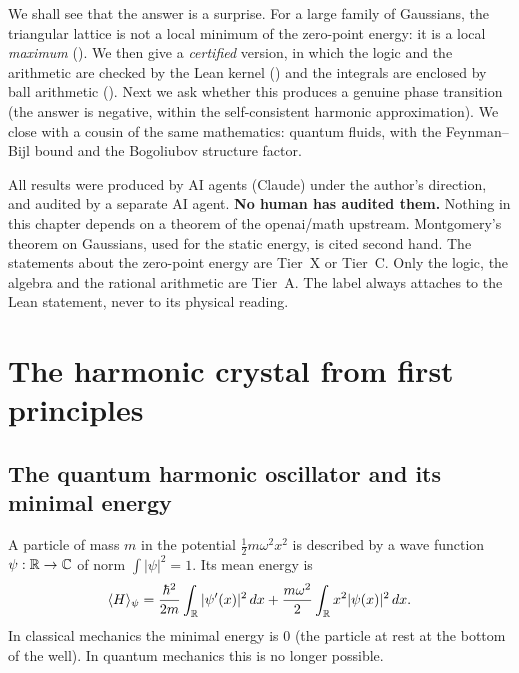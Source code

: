 We shall see that the answer is a surprise. For a large family of Gaussians, the triangular lattice is not a local
minimum of the zero-point energy: it is a local \emph{maximum} (\tierX). We then give a \emph{certified} version, in
which the logic and the arithmetic are checked by the Lean kernel (\tierA) and the integrals are enclosed by ball
arithmetic (\tierC). Next we ask whether this produces a genuine phase transition (the answer is negative, within the
self-consistent harmonic approximation). We close with a cousin of the same mathematics: quantum fluids, with the
Feynman--Bijl bound and the Bogoliubov structure factor.

\begin{warnbox}
All results were produced by AI agents (Claude) under the author's direction, and audited by a separate AI agent.
\textbf{No human has audited them.} Nothing in this chapter depends on a theorem of the openai/math upstream.
Montgomery's theorem on Gaussians, used for the static energy, is cited second hand.
The statements about the zero-point energy are Tier~X or Tier~C. Only the logic, the algebra and the rational
arithmetic are Tier~A. The \tierA{} label always attaches to the Lean statement, never to its physical reading.
\end{warnbox}

\section{The harmonic crystal from first principles}\label{ch3:sec:cristal}

\subsection{The quantum harmonic oscillator and its minimal energy}\label{ch3:sec:oscillateur}
A particle of mass $m$ in the potential $\tfrac12m\omega^2x^2$ is described by a wave function
$\psi:\mathbb{R}\to\mathbb{C}$ of norm $\int|\psi|^2=1$. Its mean energy is
\[
\langle H\rangle_\psi=\frac{\hbar^2}{2m}\int_{\mathbb{R}}|\psi'(x)|^2\,dx+\frac{m\omega^2}{2}\int_{\mathbb{R}} x^2|\psi(x)|^2\,dx .
\]
In classical mechanics the minimal energy is $0$ (the particle at rest at the bottom of the well). In quantum
mechanics this is no longer possible.

